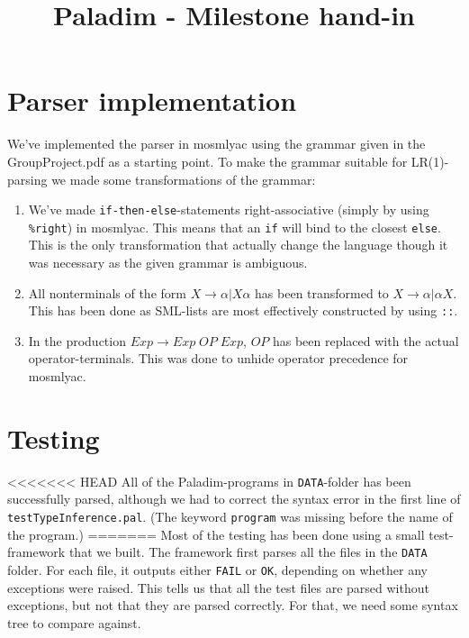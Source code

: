\documentclass{article}
\title{Paladim - Milestone hand-in}
\author{}
\begin{document}
\maketitle
\newpage
\section{Parser implementation}
We've implemented the parser in mosmlyac using the grammar given in the GroupProject.pdf
as a starting point. To make the grammar suitable for LR(1)-parsing we made some
transformations of the grammar:
\begin{enumerate}
  \item We've made \texttt{if-then-else}-statements right-associative (simply by using
        \texttt{\%right}) in mosmlyac. This means that an \texttt{if} will bind to the
        closest \texttt{else}. This is the only transformation that actually change the
        language though it was necessary as the given grammar is ambiguous.
  \item All nonterminals of the form $X \rightarrow \alpha | X \alpha$ has been transformed
        to $X \rightarrow \alpha | \alpha X$. This has been done as SML-lists are most
        effectively constructed by using \texttt{::}.
  \item In the production $Exp \rightarrow Exp \; OP \; Exp$, $OP$ has been replaced with
        the actual operator-terminals. This was done to unhide operator precedence for
        mosmlyac.
\end{enumerate}
\section{Testing}
<<<<<<< HEAD
All of the Paladim-programs in \texttt{DATA}-folder has been successfully parsed, although 
we had to correct the syntax error in the first line of \texttt{testTypeInference.pal}.
(The keyword \texttt{program} was missing before the name of the program.)
=======
Most of the testing has been done using a small test-framework that we built. The framework
first parses all the files in the \texttt{DATA} folder. For each file, it outputs either
\texttt{FAIL} or \texttt{OK}, depending on whether any exceptions were raised. This tells us
that all the test files are parsed without exceptions, but not that they are parsed correctly.
For that, we need some syntax tree to compare against.
\end{document}
